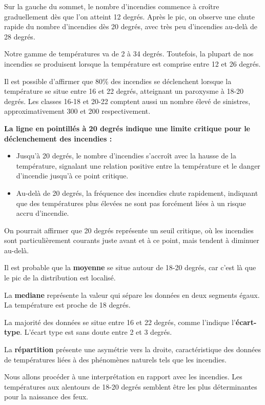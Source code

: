 \documentclass[
]{article}
\begin{document}
Sur la gauche du sommet, le nombre d'incendies commence à croître
graduellement dès que l'on atteint 12 degrés. Après le pic, on observe
une chute rapide du nombre d'incendies dès 20 degrés, avec très peu
d'incendies au-delà de 28 degrés.

Notre gamme de températures va de 2 à 34 degrés. Toutefois, la plupart
de nos incendies se produisent lorsque la température est comprise entre
12 et 26 degrés.

Il est possible d'affirmer que 80\% des incendies se déclenchent lorsque
la température se situe entre 16 et 22 degrés, atteignant un paroxysme à
18-20 degrés. Les classes 16-18 et 20-22 comptent aussi un nombre élevé
de sinistres, approximativement 300 et 200 respectivement.

\textbf{La ligne en pointillés à 20 degrés indique une limite critique
pour le déclenchement des incendies :}

\begin{itemize}
\item
  Jusqu'à 20 degrés, le nombre d'incendies s'accroît avec la hausse de
  la température, signalant une relation positive entre la température
  et le danger d'incendie jusqu'à ce point critique.
\item
  Au-delà de 20 degrés, la fréquence des incendies chute rapidement,
  indiquant que des températures plus élevées ne sont pas forcément
  liées à un risque accru d'incendie.
\end{itemize}

On pourrait affirmer que 20 degrés représente un seuil critique, où les
incendies sont particulièrement courants juste avant et à ce point, mais
tendent à diminuer au-delà.

Il est probable que la \textbf{moyenne} se situe autour de 18-20 degrés,
car c'est là que le pic de la distribution est localisé.

La \textbf{mediane} représente la valeur qui sépare les données en deux
segments égaux. La température est proche de 18 degrés.

La majorité des données se situe entre 16 et 22 degrés, comme l'indique
l'\textbf{écart-type}. L'écart type est sans doute entre 2 et 3 degrés.

La \textbf{répartition} présente une asymétrie vers la droite,
caractéristique des données de températures liées à des phénomènes
naturels tels que les incendies.

Nous allons procéder à une interprétation en rapport avec les incendies.
Les températures aux alentours de 18-20 degrés semblent être les plus
déterminantes pour la naissance des feux.
\end{document}
